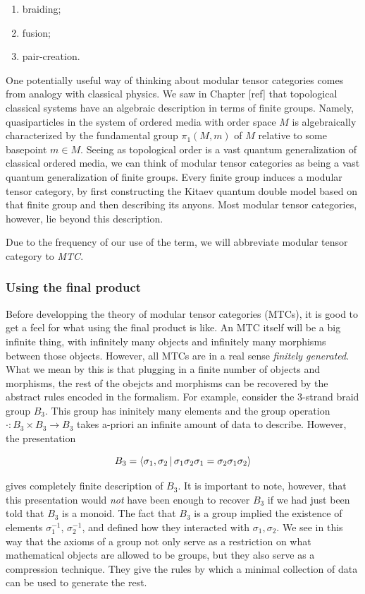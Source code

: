\documentclass{article}
\theoremstyle{definition}
\numberwithin{figure}{section}
\begin{document}
\begin{enumerate}
\item braiding;
\item fusion;
\item pair-creation.
\end{enumerate}

One potentially useful way of thinking about modular tensor categories comes from analogy with classical physics. We saw in Chapter [ref] that topological classical systems have an algebraic description in terms of finite groups. Namely, quasiparticles in the system of ordered media with order space $M$ is algebraically characterized by the fundamental group $\pi_1(M,m)$ of $M$ relative to some basepoint $m\in M$. Seeing as topological order is a vast quantum generalization of classical ordered media, we can think of modular tensor categories as being a vast quantum generalization of finite groups. Every finite group induces a modular tensor category, by first constructing the Kitaev quantum double model based on that finite group and then describing its anyons. Most modular tensor categories, however, lie beyond this description.

Due to the frequency of our use of the term, we will abbreviate modular tensor category to \textit{MTC}.

\subsubsection{Using the final product}

Before developping the theory of modular tensor categories (MTCs), it is good to get a feel for what using the final product is like. An MTC itself will be a big infinite thing, with infinitely many objects and infinitely many morphisms between those objects. However, all MTCs are in a real sense \textit{finitely generated}. What we mean by this is that plugging in a finite number of objects and morphisms, the rest of the obejcts and morphisms can be recovered by the abstract rules encoded in the formalism. For example, consider the 3-strand braid group $B_3$. This group has ininitely many elements and the group operation $\cdot: B_3\times B_3\to B_3$ takes a-priori an infinite amount of data to describe. However, the presentation

$$B_3=\Braket{\sigma_1, \sigma_2 | \sigma_1 \sigma_2 \sigma_1 = \sigma_2 \sigma_1 \sigma_2}$$

gives  completely finite description of $B_3$. It is important to note, however, that this presentation would \textit{not} have been enough to recover $B_3$ if we had just been told that $B_3$ is a monoid. The fact that $B_3$ is a group implied the existence of elements $\sigma_1^{-1}$, $\sigma_{2}^{-1}$, and defined how they interacted with $\sigma_1,\sigma_2$. We see in this way that the axioms of a group not only serve as a restriction on what mathematical objects are allowed to be groups, but they also serve as a compression technique. They give the rules by which a minimal collection of data can be used to generate the rest.
\end{document}

